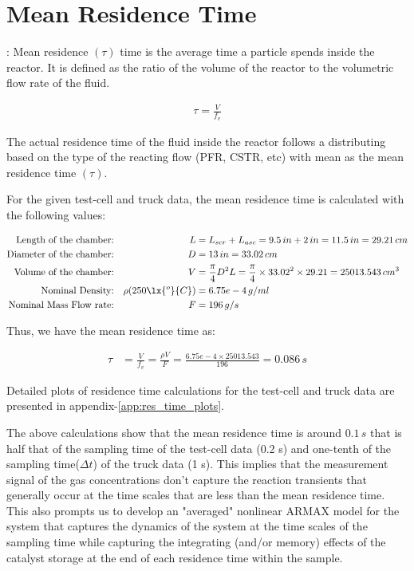 \section{Mean Residence Time}

: Mean residence $(\tau)$ time is the average time a particle
spends inside the reactor. It is defined as the ratio of the volume of the
reactor to the volumetric flow rate of the fluid.

\begin{align}
    \tau = \frac{V}{f_v}
\end{align}

The actual residence time of the fluid inside the reactor follows a distributing
based on the type of the reacting flow (PFR, CSTR, etc) with mean as the mean
residence time $(\tau)$.

For the given test-cell and truck data, the mean residence time is calculated
with the following values:

\begin{align*}
    \text{Length of the chamber:}&&
    L &= L_{scr} + L_{asc} = 9.5 \, in  + 2 \, in = 11.5 \, in = 29.21 \, cm\\
    \text{Diameter of the chamber:} &&
    D &= 13 \, in = 33.02 \, cm\\
    \text{Volume of the chamber:} &&
    V &= \frac{\pi}{4} D^2 L = \frac{\pi}{4} \times 33.02^2 \times 29.21 = 25013.543 \, cm^3\\
    \text{Nominal Density:} &&
    \rho(250 \lx{^o}{C}) &= 6.75e-4 \, g/ml\\
    \text{Nominal Mass Flow rate:} &&
    F &= 196 \, g/s\\
\end{align*}

Thus, we have the mean residence time as:

\begin{align}
    \tau &= \frac{V}{f_v} = \frac{\rho V}{F} = \frac{6.75e-4 \times 25013.543}{196} = 0.086 \, s
\end{align}

Detailed plots of residence time calculations for the test-cell and truck data
are presented in appendix-\ref{app:res_time_plots}.

The above calculations show that the mean residence time is around $0.1 \, s$
that is half that of the sampling time of the test-cell data (0.2 s) and
one-tenth of the sampling time($\Delta t$) of the truck data (1 s). This
implies that the measurement signal of the gas concentrations don't capture the
reaction transients that generally occur at the time scales  that are less than
the mean residence time. This also prompts us to develop an "averaged"
nonlinear ARMAX model for the system that captures the dynamics of the system
at the time scales of the sampling time while capturing the integrating (and/or
memory) effects of the catalyst storage at the end of each residence time
within the sample.

